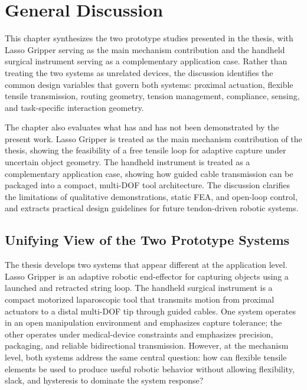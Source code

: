 \chapter{General Discussion}

\label{ChapterDiscussion}

\begin{chaptersummary}
This chapter synthesizes the two prototype studies presented in the thesis, with Lasso Gripper serving as the main mechanism contribution and the handheld surgical instrument serving as a complementary application case. Rather than treating the two systems as unrelated devices, the discussion identifies the common design variables that govern both systems: proximal actuation, flexible tensile transmission, routing geometry, tension management, compliance, sensing, and task-specific interaction geometry.

The chapter also evaluates what has and has not been demonstrated by the present work. Lasso Gripper is treated as the main mechanism contribution of the thesis, showing the feasibility of a free tensile loop for adaptive capture under uncertain object geometry. The handheld instrument is treated as a complementary application case, showing how guided cable transmission can be packaged into a compact, multi-DOF tool architecture. The discussion clarifies the limitations of qualitative demonstrations, static FEA, and open-loop control, and extracts practical design guidelines for future tendon-driven robotic systems.
\end{chaptersummary}

\section{Unifying View of the Two Prototype Systems}

The thesis develops two systems that appear different at the application level. Lasso Gripper is an adaptive robotic end-effector for capturing objects using a launched and retracted string loop. The handheld surgical instrument is a compact motorized laparoscopic tool that transmits motion from proximal actuators to a distal multi-DOF tip through guided cables. One system operates in an open manipulation environment and emphasizes capture tolerance; the other operates under medical-device constraints and emphasizes precision, packaging, and reliable bidirectional transmission. However, at the mechanism level, both systems address the same central question: how can flexible tensile elements be used to produce useful robotic behavior without allowing flexibility, slack, and hysteresis to dominate the system response?

